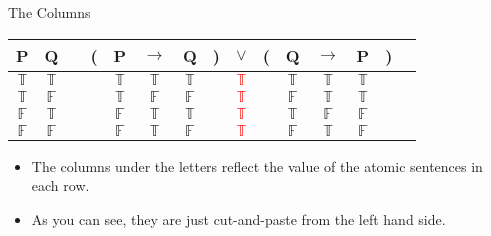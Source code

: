 \documentclass[
  ignorenonframetext,
]{beamer}
\providecommand{\tightlist}{%
  \setlength{\itemsep}{0pt}\setlength{\parskip}{0pt}}
\renewcommand{\,}{\text{, }}
\def\True{\mathbb{T}}
\def\False{\mathbb{F}}
\begin{document}
\begin{frame}{The Columns}
\protect\hypertarget{the-columns}{}

\begin{center}
\begin{tabular}{@{ }c@{ }@{ }c | c@{ }@{}c@{}@{ }c@{ }@{ }c@{ }@{ }c@{ }@{}c@{}@{ }c@{ }@{}c@{}@{ }c@{ }@{ }c@{ }@{ }c@{ }@{}c@{}@{ }c}
P & Q &  & ( & P & $\rightarrow$ & Q & ) & $\lor$ & ( & Q & $\rightarrow$ & P & ) & \\
\hline 
$\True$ & $\True$ &  &  & $\True$ & $\True$ & $\True$ &  & \textcolor{red}{$\True$} &  & $\True$ & $\True$ & $\True$ &  & \\
$\True$ & $\False$ &  &  & $\True$ & $\False$ & $\False$ &  & \textcolor{red}{$\True$} &  & $\False$ & $\True$ & $\True$ &  & \\
$\False$ & $\True$ &  &  & $\False$ & $\True$ & $\True$ &  & \textcolor{red}{$\True$} &  & $\True$ & $\False$ & $\False$ &  & \\
$\False$ & $\False$ &  &  & $\False$ & $\True$ & $\False$ &  & \textcolor{red}{$\True$} &  & $\False$ & $\True$ & $\False$ &  & \\
\end{tabular}
\bigskip
\end{center}

\begin{itemize}
\tightlist
\item
  The columns under the letters reflect the value of the atomic
  sentences in each row.
\item
  As you can see, they are just cut-and-paste from the left hand side.
\end{itemize}

\end{frame}
\end{document}
